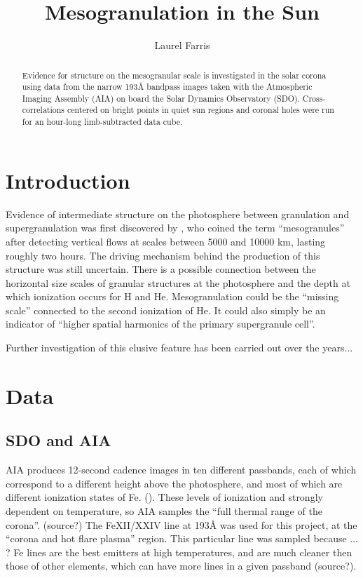 \documentclass[preprint]{aastex}
\begin{document}
\title{Mesogranulation in the Sun}
\author{Laurel Farris}

\begin{abstract}
    Evidence for structure on the mesogranular scale is investigated
    in the solar corona using data from the narrow 193\AA{} bandpass
    images taken with the Atmospheric Imaging Assembly (AIA) on board
    the Solar Dynamics Observatory (SDO). Cross-correlations centered
    on bright points in quiet sun regions and coronal holes were run
    for an hour-long limb-subtracted data cube.
\end{abstract}

\section{Introduction}\label{intro}
Evidence of intermediate structure on the photosphere between
granulation and supergranulation was first discovered by
\cite{November}, who coined the term ``mesogranules'' after detecting
vertical flows at scales between 5000 and 10000 km, lasting roughly
two hours. The driving mechanism behind the production of this
structure was still uncertain. There is a possible connection between
the horizontal size scales of granular structures at the photosphere
and the depth at which ionization occurs for H and He.
Mesogranulation could be the ``missing scale'' connected to the second
ionization of He. It could also simply be an indicator of
``higher spatial harmonics of the primary supergranule cell''.

Further investigation of this elusive feature has been carried out
over the years$\ldots$

\section{Data}
\subsection{SDO and AIA}
AIA produces 12-second cadence images
in ten different passbands, each of which correspond
to a different height above the photosphere,
and most of which are different ionization states of Fe.
(\cite{Lemen}).
These levels of ionization and strongly dependent on temperature,
so AIA samples the ``full thermal range of the corona''. (source?)
The FeXII/XXIV line at 193\AA{} was used for this project,
at the ``corona and hot flare plasma'' region.
This particular line was sampled because $\ldots$?
Fe lines are the best emitters at high temperatures, and are much
cleaner then those of other elements, which can have more lines in a
given passband (source?).
\end{document}
